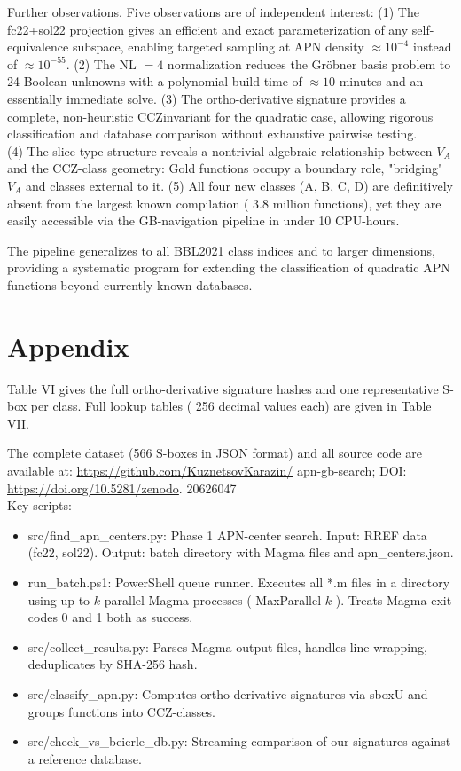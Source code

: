 \documentclass[10pt]{article}
\begin{document}
Further observations. Five observations are of independent interest: (1) The fc22+sol22 projection gives an efficient and exact parameterization of any self-equivalence subspace, enabling targeted sampling at APN density $\approx 10^{-4}$ instead of $\approx 10^{-55}$. (2) The NL $=4$ normalization reduces the Gröbner basis problem to 24 Boolean unknowns with a polynomial build time of $\approx 10$ minutes and an essentially immediate solve. (3) The ortho-derivative signature provides a complete, non-heuristic CCZinvariant for the quadratic case, allowing rigorous classification and database comparison without exhaustive pairwise testing.\\
(4) The slice-type structure reveals a nontrivial algebraic relationship between $V_{A}$ and the CCZ-class geometry: Gold functions occupy a boundary role, "bridging" $V_{A}$ and classes external to it. (5) All four new classes (A, B, C, D) are definitively absent from the largest known compilation ( 3.8 million functions), yet they are easily accessible via the GB-navigation pipeline in under 10 CPU-hours.

The pipeline generalizes to all BBL2021 class indices and to larger dimensions, providing a systematic program for extending the classification of quadratic APN functions beyond currently known databases.

\section*{Appendix}
Table VI gives the full ortho-derivative signature hashes and one representative S-box per class. Full lookup tables ( 256 decimal values each) are given in Table VII.

The complete dataset (566 S-boxes in JSON format) and all source code are available at: \href{https://github.com/KuznetsovKarazin/}{https://github.com/KuznetsovKarazin/} apn-gb-search; DOI: \href{https://doi.org/10.5281/zenodo}{https://doi.org/10.5281/zenodo}. 20626047\\
Key scripts:

\begin{itemize}
  \item src/find\_apn\_centers.py: Phase 1 APN-center search. Input: RREF data (fc22, sol22). Output: batch directory with Magma files and apn\_centers.json.
  \item run\_batch.ps1: PowerShell queue runner. Executes all *.m files in a directory using up to $k$ parallel Magma processes (-MaxParallel $k$ ). Treats Magma exit codes 0 and 1 both as success.
  \item src/collect\_results.py: Parses Magma output files, handles line-wrapping, deduplicates by SHA-256 hash.
  \item src/classify\_apn.py: Computes ortho-derivative signatures via sboxU and groups functions into CCZ-classes.
  \item src/check\_vs\_beierle\_db.py: Streaming comparison of our signatures against a reference database.
\end{itemize}
\end{document}
